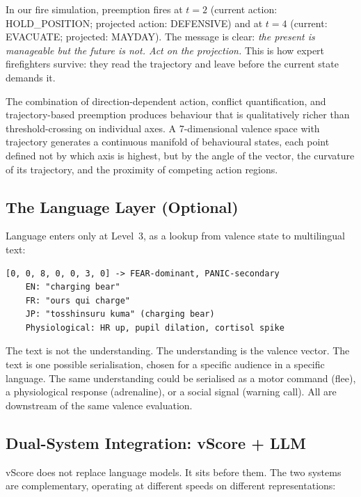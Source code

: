 \documentclass[11pt]{article}
\begin{document}
In our fire simulation, preemption fires at $t=2$ (current action: HOLD\_POSITION; projected action: DEFENSIVE) and at $t=4$ (current: EVACUATE; projected: MAYDAY). The message is clear: \emph{the present is manageable but the future is not. Act on the projection.} This is how expert firefighters survive: they read the trajectory and leave before the current state demands it.

The combination of direction-dependent action, conflict quantification, and trajectory-based preemption produces behaviour that is qualitatively richer than threshold-crossing on individual axes. A 7-dimensional valence space with trajectory generates a continuous manifold of behavioural states, each point defined not by which axis is highest, but by the angle of the vector, the curvature of its trajectory, and the proximity of competing action regions.

\subsection{The Language Layer (Optional)}

Language enters only at Level~3, as a lookup from valence state to multilingual text:

\begin{lstlisting}[language={}]
[0, 0, 8, 0, 0, 3, 0] -> FEAR-dominant, PANIC-secondary
    EN: "charging bear"
    FR: "ours qui charge"
    JP: "tosshinsuru kuma" (charging bear)
    Physiological: HR up, pupil dilation, cortisol spike
\end{lstlisting}

The text is not the understanding. The understanding is the valence vector. The text is one possible serialisation, chosen for a specific audience in a specific language. The same understanding could be serialised as a motor command (flee), a physiological response (adrenaline), or a social signal (warning call). All are downstream of the same valence evaluation.

\subsection{Dual-System Integration: vScore + LLM}

vScore does not replace language models. It sits before them. The two systems are complementary, operating at different speeds on different representations:
\end{document}
